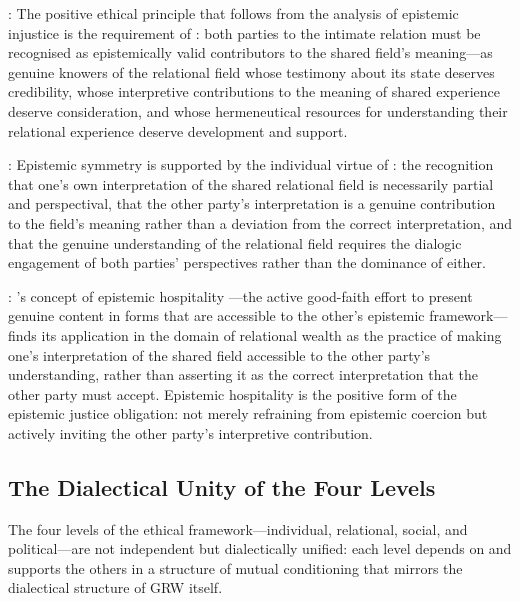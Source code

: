 : The positive ethical principle that follows from the analysis of epistemic injustice is the requirement of : both parties to the intimate relation must be recognised as epistemically valid contributors to the shared field's meaning---as genuine knowers of the relational field whose testimony about its state deserves credibility, whose interpretive contributions to the meaning of shared experience deserve consideration, and whose hermeneutical resources for understanding their relational experience deserve development and support.

: Epistemic symmetry is supported by the individual virtue of : the recognition that one's own interpretation of the shared relational field is necessarily partial and perspectival, that the other party's interpretation is a genuine contribution to the field's meaning rather than a deviation from the correct interpretation, and that the genuine understanding of the relational field requires the dialogic engagement of both parties' perspectives rather than the dominance of either.

: 's concept of epistemic hospitality \parencite{paperxiii}---the active good-faith effort to present genuine content in forms that are accessible to the other's epistemic framework---finds its application in the domain of relational wealth as the practice of making one's interpretation of the shared field accessible to the other party's understanding, rather than asserting it as the correct interpretation that the other party must accept. Epistemic hospitality is the positive form of the epistemic justice obligation: not merely refraining from epistemic coercion but actively inviting the other party's interpretive contribution.

\subsection{The Dialectical Unity of the Four Levels}
\label{p15:subsec:dialectical_unity}

\noindent
The four levels of the ethical framework---individual, relational, social, and political---are not independent but dialectically unified: each level depends on and supports the others in a structure of mutual conditioning that mirrors the dialectical structure of GRW itself.

